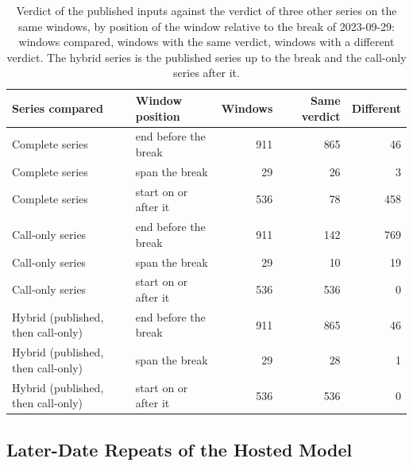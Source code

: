 \begin{table}[H]
\centering
\caption{Verdict of the published inputs against the verdict of three other series on the same windows, by position of the window relative to the break of 2023-09-29: windows compared, windows with the same verdict, windows with a different verdict. The hybrid series is the published series up to the break and the call-only series after it.}
\label{tab:stored:lineage}
\footnotesize
\begin{tabular}{@{}llrrr@{}}
\toprule
Series compared & Window position & Windows & Same verdict & Different \\
\midrule
Complete series & end before the break & 911 & 865 & 46 \\
Complete series & span the break & 29 & 26 & 3 \\
Complete series & start on or after it & 536 & 78 & 458 \\
Call-only series & end before the break & 911 & 142 & 769 \\
Call-only series & span the break & 29 & 10 & 19 \\
Call-only series & start on or after it & 536 & 536 & 0 \\
Hybrid (published, then call-only) & end before the break & 911 & 865 & 46 \\
Hybrid (published, then call-only) & span the break & 29 & 28 & 1 \\
Hybrid (published, then call-only) & start on or after it & 536 & 536 & 0 \\
\bottomrule
\end{tabular}
\end{table}

\subsection{Later-Date Repeats of the Hosted Model}
\label{sup:stored:drift}


